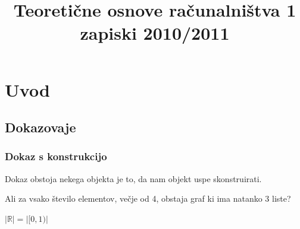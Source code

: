 \documentclass[10pt,a4paper,oneside]{book}
\title{Teoretične osnove računalništva 1\\ \large zapiski 2010/2011}
\begin{document}
\maketitle
\newpage
\tableofcontents


\pagebreak
\chapter{Uvod}
\section{Dokazovaje}
\subsection{Dokaz s konstrukcijo}
Dokaz obstoja nekega objekta je to, da nam objekt uspe skonstruirati.

\begin{primeri}
\item Ali za vsako število elementov, večje od 4, obstaja graf ki ima natanko 3 liste?
\item $| \mathbb{R} | = | [0,1) |$
\end{primeri}
	
\end{document}
